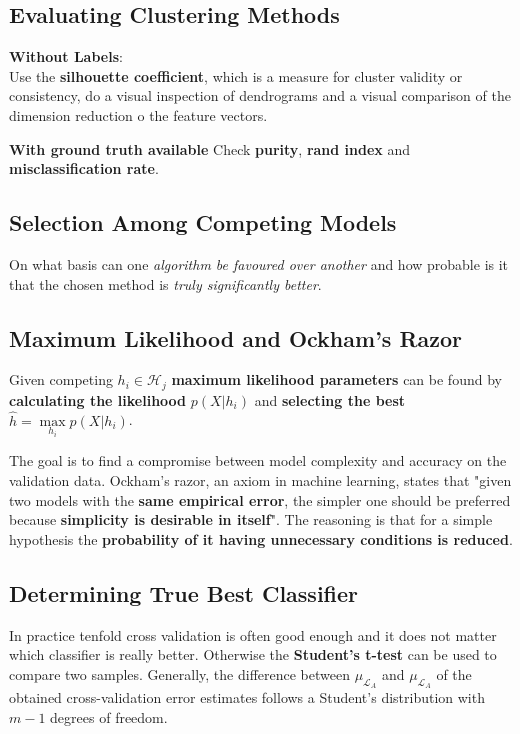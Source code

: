\documentclass[11pt]{article}
\theoremstyle{definition}
\begin{document}
\subsection{Evaluating Clustering Methods}
\textbf{Without Labels}:\\
Use the \textbf{silhouette coefficient}, which is a measure for cluster validity or consistency, do a visual inspection of dendrograms and a visual comparison of the dimension reduction o the feature vectors.

\vspace{1em}
\noindent
\textbf{With ground truth available}
Check \textbf{purity}, \textbf{rand index} and \textbf{misclassification rate}.

\subsection{Selection Among Competing Models}
On what basis can one \emph{algorithm be favoured over another} and how probable is it that the chosen method is \emph{truly significantly better}.

\subsection{Maximum Likelihood and Ockham's Razor}
Given competing $h_i \in \mathcal{H}_j$ \textbf{maximum likelihood parameters} can be found by \textbf{calculating the likelihood} $p(X|h_i)$ and \textbf{selecting the best} $\hat{h} = \underset{h_i}{\max} p(X|h_i)$.

The goal is to find a compromise between model complexity and accuracy on the validation data. Ockham's razor, an axiom in machine learning, states that "given two models with the \textbf{same empirical error}, the simpler one should be preferred because \textbf{simplicity is desirable in itself}". The reasoning is that for a simple hypothesis the \textbf{probability of it having unnecessary conditions is reduced}.

\subsection{Determining True Best Classifier}
In practice tenfold cross validation is often good enough and it does not matter which classifier is really better. Otherwise the \textbf{Student's t-test} can be used to compare two samples. Generally, the difference between $\mu_{\mathcal{L}_A}$ and $\mu_{\mathcal{L}_A}$ of the obtained cross-validation error estimates follows a Student's distribution with $m-1$ degrees of freedom.
\end{document}
